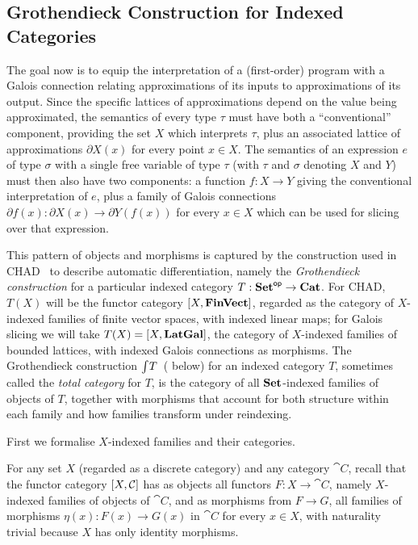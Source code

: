 \subsection{Grothendieck Construction for Indexed Categories}
\label{sec:Grothendieck}

The goal now is to equip the interpretation of a (first-order) program with a Galois connection relating
approximations of its inputs to approximations of its output. Since the specific lattices of approximations
depend on the value being approximated, the semantics of every type $\tau$ must have both a ``conventional''
component, providing the set $X$ which interprets $\tau$, plus an associated lattice of approximations
$\partial X(x)$ for every point $x \in X$. The semantics of an expression $e$ of type $\sigma$ with a single
free variable of type $\tau$ (with $\tau$ and $\sigma$ denoting $X$ and $Y$) must then also have two
components: a function $f: X \to Y$ giving the conventional interpretation of $e$, plus a family of Galois
connections $\partial f(x): \partial X(x) \to \partial Y(f(x))$ for every $x \in X$ which can be used for
slicing over that expression.

This pattern of objects and morphisms is captured by the construction used in CHAD~\cite{vákár22,nunes2023} to
describe automatic differentiation, namely the \emph{Grothendieck construction} for a particular indexed
category $T: \mathbf{Set}^{\mathsf{op}} \to \mathbf{Cat}$. For CHAD, $T(X)$ will be the functor category $[X,\mathbf{FinVect}]$, regarded
as the category of $X$-indexed families of finite vector spaces, with indexed linear maps; for Galois slicing
we will take $T(X) = [X,\mathbf{LatGal}]$, the category of $X$-indexed families of bounded lattices, with
indexed Galois connections as morphisms. The Grothendieck construction
$\int_{}T$~( below) for an indexed category $T$, sometimes called the \emph{total
category} for $T$, is the category of all $\mathbf{Set}$-indexed families of objects of $T$, together with morphisms
that account for both structure within each family and how families transform under reindexing.

First we formalise $X$-indexed families and their categories.

\begin{definition}
For any set $X$ (regarded as a discrete category) and any category $\cat{C}$, recall that the functor
category $[X,\mathcal{C}]$ has as objects all functors $F: X \to \cat{C}$, namely $X$-indexed families of
objects of $\cat{C}$, and as morphisms from $F \to G$, all families of morphisms $\eta(x): F(x) \to G(x)$ in
$\cat{C}$ for every $x \in X$, with naturality trivial because $X$ has only identity morphisms.
\end{definition}


